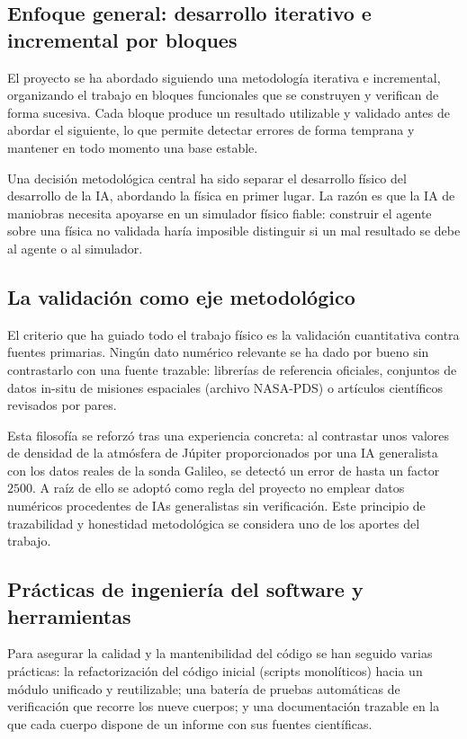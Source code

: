 \subsection{Enfoque general: desarrollo iterativo e incremental por bloques}

El proyecto se ha abordado siguiendo una metodología iterativa e incremental, organizando el trabajo en bloques funcionales que se construyen y verifican de forma sucesiva. Cada bloque produce un resultado utilizable y validado antes de abordar el siguiente, lo que permite detectar errores de forma temprana y mantener en todo momento una base estable.

Una decisión metodológica central ha sido separar el desarrollo físico del desarrollo de la \gls{IA}, abordando la física en primer lugar. La razón es que la \gls{IA} de maniobras necesita apoyarse en un simulador físico fiable: construir el agente sobre una física no validada haría imposible distinguir si un mal resultado se debe al agente o al simulador.

\subsection{La validación como eje metodológico}
\label{sec:validacion-metodo}

El criterio que ha guiado todo el trabajo físico es la validación cuantitativa contra fuentes primarias. Ningún dato numérico relevante se ha dado por bueno sin contrastarlo con una fuente trazable: librerías de referencia oficiales, conjuntos de datos in-situ de misiones espaciales (archivo \gls{NASA}-\gls{PDS}) o artículos científicos revisados por pares.

Esta filosofía se reforzó tras una experiencia concreta: al contrastar unos valores de densidad de la atmósfera de Júpiter proporcionados por una \gls{IA} generalista con los datos reales de la sonda Galileo, se detectó un error de hasta un factor $2500$. A raíz de ello se adoptó como regla del proyecto no emplear datos numéricos procedentes de IAs generalistas sin verificación. Este principio de trazabilidad y honestidad metodológica se considera uno de los aportes del trabajo.

\subsection{Prácticas de ingeniería del software y herramientas}

Para asegurar la calidad y la mantenibilidad del código se han seguido varias prácticas: la refactorización del código inicial (scripts monolíticos) hacia un módulo unificado y reutilizable; una batería de pruebas automáticas de verificación que recorre los nueve cuerpos; y una
documentación trazable en la que cada cuerpo dispone de un informe con sus fuentes científicas.

